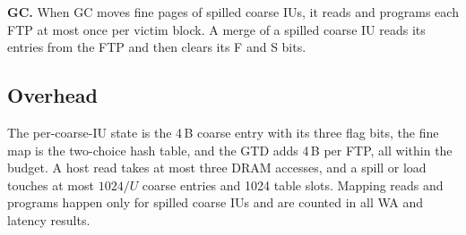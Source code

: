 \textbf{GC.} When GC moves fine pages of spilled coarse IUs, it reads and programs
each FTP at most once per victim block. A merge of a spilled coarse IU reads its
entries from the FTP and then clears its F and S bits.

\subsection{Overhead}
The per-coarse-IU state is the 4\,B coarse entry with its three flag bits, the fine
map is the two-choice hash table, and the GTD adds 4\,B per FTP, all within the budget.
A host read takes at most three DRAM accesses, and a spill or load
touches at most $1024/U$ coarse entries and 1024 table slots.
Mapping reads and programs happen only for spilled coarse IUs and are counted in all
WA and latency results.
